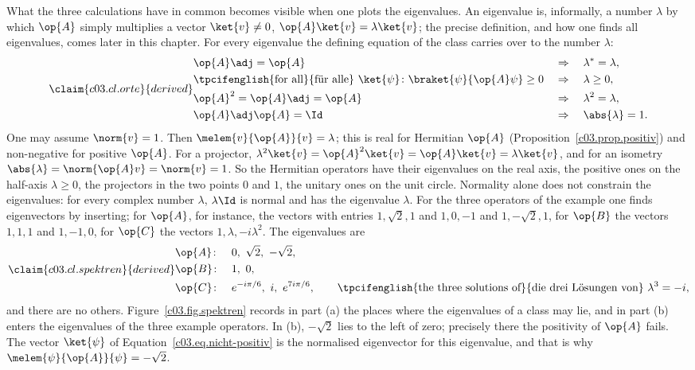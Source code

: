 What the three calculations have in common becomes visible when one plots the eigenvalues. An
eigenvalue is, informally, a number $\lambda$ by which $\op{A}$ simply multiplies a vector
$\ket{v} \neq 0$, $\op{A}\ket{v} = \lambda\ket{v}$; the precise definition, and how one finds
all eigenvalues, comes later in this chapter. For every eigenvalue the defining equation of the
class carries over to the number $\lambda$:
\begin{equation}\label{c03.eq.orte}\claim{c03.cl.orte}{derived}
  \begin{aligned}
    &\op{A}\adj = \op{A} &&\Rightarrow\quad \lambda^* = \lambda , \\
    &\text{\tpcifenglish{for all}{für alle} } \ket{\psi}\colon \braket{\psi}{\op{A}\psi} \geq 0 &&\Rightarrow\quad \lambda \geq 0 , \\
    &\op{A}^2 = \op{A}\adj = \op{A} &&\Rightarrow\quad \lambda^2 = \lambda , \\
    &\op{A}\adj\op{A} = \Id &&\Rightarrow\quad \abs{\lambda} = 1 .
  \end{aligned}
\end{equation}
One may assume $\norm{v} = 1$. Then $\melem{v}{\op{A}}{v} = \lambda$; this is real for
Hermitian $\op{A}$ (Proposition~\ref{c03.prop.positiv}) and non-negative for positive $\op{A}$.
For a projector, $\lambda^2\ket{v} = \op{A}^2\ket{v} = \op{A}\ket{v} = \lambda\ket{v}$, and for
an isometry $\abs{\lambda} = \norm{\op{A}v} = \norm{v} = 1$. So the Hermitian operators have
their eigenvalues on the real axis, the positive ones on the half-axis $\lambda \geq 0$, the
projectors in the two points $0$ and $1$, the unitary ones on the unit circle. Normality alone
does not constrain the eigenvalues: for every complex number $\lambda$, $\lambda\Id$ is normal
and has the eigenvalue $\lambda$. For the three operators of the example one finds eigenvectors
by inserting; for $\op{A}$, for instance, the vectors with entries $1, \sqrt{2}, 1$ and
$1, 0, -1$ and $1, -\sqrt{2}, 1$, for $\op{B}$ the vectors $1, 1, 1$ and $1, -1, 0$, for
$\op{C}$ the vectors $1, \lambda, -i\lambda^2$. The eigenvalues are
\begin{equation}\label{c03.eq.spektren}\claim{c03.cl.spektren}{derived}
  \begin{aligned}
    &\op{A}\colon && 0 ,\ \sqrt{2} ,\ -\sqrt{2} , \\
    &\op{B}\colon && 1 ,\ 0 , \\
    &\op{C}\colon && e^{-i\pi/6} ,\ i ,\ e^{7i\pi/6} , \qquad \text{\tpcifenglish{the three solutions of}{die drei Lösungen von}}\ \lambda^3 = -i ,
  \end{aligned}
\end{equation}
and there are no others. Figure~\ref{c03.fig.spektren} records in part (a) the places where the
eigenvalues of a class may lie, and in part (b) enters the eigenvalues of the three example
operators. In (b), $-\sqrt{2}$ lies to the left of zero; precisely there the positivity of
$\op{A}$ fails. The vector $\ket{\psi}$ of Equation~\eqref{c03.eq.nicht-positiv} is the
normalised eigenvector for this eigenvalue, and that is why
$\melem{\psi}{\op{A}}{\psi} = -\sqrt{2}$.

